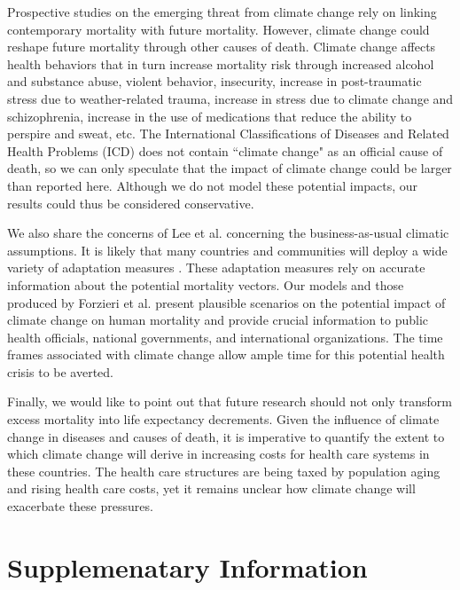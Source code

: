 \documentclass[12pt,]{article}
\begin{document}
Prospective studies on the emerging threat from climate change rely on
linking contemporary mortality with future mortality. However, climate
change could reshape future mortality through other causes of death.
Climate change affects health behaviors that in turn increase mortality
risk through increased alcohol and substance abuse, violent behavior,
insecurity, increase in post-traumatic stress due to weather-related
trauma, increase in stress due to climate change and schizophrenia,
increase in the use of medications that reduce the ability to perspire
and sweat, etc. \citep{patz2005impact} The International Classifications
of Diseases and Related Health Problems (ICD) does not contain ``climate
change" as an official cause of death, so we can only speculate that the
impact of climate change could be larger than reported here. Although we
do not model these potential impacts, our results could thus be
considered conservative.

We also share the concerns of Lee et al. \citep{lee2017comprehensive}
concerning the business-as-usual climatic assumptions. It is likely that
many countries and communities will deploy a wide variety of adaptation
measures \citep{haines2006climate, kovats2003methods, ebi2006approach}.
These adaptation measures rely on accurate information about the
potential mortality vectors. Our models and those produced by Forzieri
et al. \citep{forzieri2017increasing} present plausible scenarios on the
potential impact of climate change on human mortality and provide
crucial information to public health officials, national governments,
and international organizations. The time frames associated with climate
change allow ample time for this potential health crisis to be averted.

Finally, we would like to point out that future research should not only
transform excess mortality into life expectancy decrements. Given the
influence of climate change in diseases and causes of death, it is
imperative to quantify the extent to which climate change will derive in
increasing costs for health care systems in these countries. The health
care structures are being taxed by population aging
\citep{rechel2009can} and rising health care costs, yet it remains
unclear how climate change will exacerbate these pressures.

\newpage

\section{Supplemenatary Information}\label{supplemenatary-information}
\end{document}
